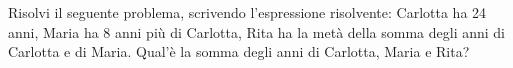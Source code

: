 \item Risolvi il seguente problema, scrivendo l'espressione risolvente: Carlotta ha 24 anni, Maria ha 8 anni più di Carlotta, Rita ha la metà della somma degli anni di Carlotta e di Maria. Qual'è la somma degli anni di Carlotta, Maria e Rita?